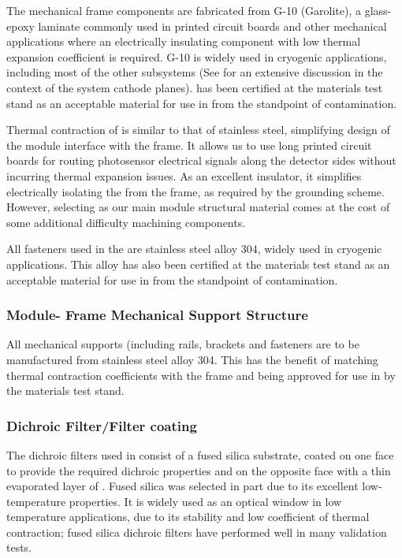 The  mechanical frame components are fabricated from \frfour G-10 (Garolite\textregistered), a glass-epoxy laminate commonly used in printed circuit boards and other mechanical applications where an electrically insulating component with low thermal expansion coefficient is required.  G-10 is widely used in cryogenic applications, including most of the other  subsystems (See  for an extensive discussion in the context of the  system cathode planes). 
\frfour has been certified at the  materials test stand as an acceptable material for use in  from the standpoint of  contamination.

Thermal contraction of \frfour is similar to that of stainless steel, simplifying design of the module interface with the  frame.
It allows us to use long printed circuit boards for routing photosensor electrical signals along the detector sides without incurring thermal expansion issues.  As an excellent insulator, it simplifies electrically isolating the  from the  frame, as required by the  grounding scheme.
However, selecting \frfour as our main module structural material comes at the cost of some additional difficulty machining components.

All fasteners used in the  are stainless steel alloy 304, widely used in cryogenic applications.  This alloy has also been certified at the  materials test stand as an acceptable material for use in  from the standpoint of  contamination.

\subsubsection{ Module- Frame Mechanical Support Structure}

All  mechanical supports (including rails, brackets and fasteners are to be manufactured from stainless steel alloy 304.  This has the benefit of matching thermal contraction coefficients with the  frame and being approved for use in  by the materials test stand.

\subsubsection{Dichroic Filter/Filter coating}

The dichroic filters used in  consist of a fused silica substrate, coated on one face to provide the required dichroic properties and on the opposite face with a thin evaporated layer of .
Fused silica was selected in part due to its excellent low-temperature properties.  It is widely used as an optical window in low temperature applications, due to its stability and low coefficient of thermal contraction; fused silica dichroic filters have performed well in many  validation tests.

